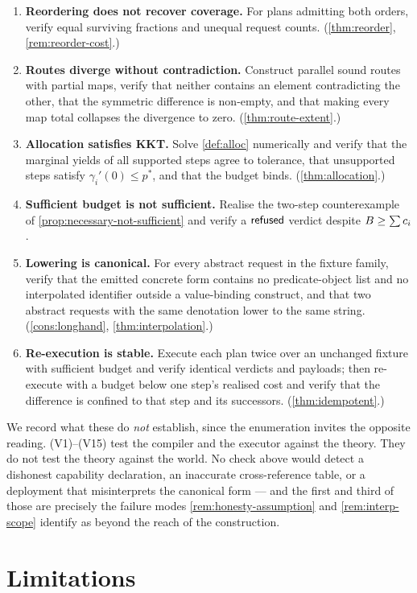 \begin{enumerate}[label=(V\arabic*),leftmargin=3em]
\item \textbf{Reordering does not recover coverage.} For plans admitting both
orders, verify equal surviving fractions and unequal request counts.
(\cref{thm:reorder}, \cref{rem:reorder-cost}.)
\item \textbf{Routes diverge without contradiction.} Construct parallel sound
routes with partial maps, verify that neither contains an element contradicting
the other, that the symmetric difference is non-empty, and that making every
map total collapses the divergence to zero.
(\cref{thm:route-extent}.)
\item \textbf{Allocation satisfies KKT.} Solve \cref{def:alloc} numerically and
verify that the marginal yields of all supported steps agree to tolerance, that
unsupported steps satisfy $\gamma_i'(0) \leq p^\ast$, and that the budget binds.
(\cref{thm:allocation}.)
\item \textbf{Sufficient budget is not sufficient.} Realise the two-step
counterexample of \cref{prop:necessary-not-sufficient} and verify a $\textsf{refused}$
verdict despite $B \geq \sum c_i$.
\item \textbf{Lowering is canonical.} For every abstract request in the fixture
family, verify that the emitted concrete form contains no predicate-object list
and no interpolated identifier outside a value-binding construct, and that two
abstract requests with the same denotation lower to the same string.
(\cref{cons:longhand}, \cref{thm:interpolation}.)
\item \textbf{Re-execution is stable.} Execute each plan twice over an unchanged
fixture with sufficient budget and verify identical verdicts and payloads; then
re-execute with a budget below one step's realised cost and verify that the
difference is confined to that step and its successors.
(\cref{thm:idempotent}.)
\end{enumerate}

We record what these do \emph{not} establish, since the enumeration invites the
opposite reading. (V1)--(V15) test the compiler and the executor against the
theory. They do not test the theory against the world. No check above would
detect a dishonest capability declaration, an inaccurate cross-reference table,
or a deployment that misinterprets the canonical form --- and the first and
third of those are precisely the failure modes \cref{rem:honesty-assumption}
and \cref{rem:interp-scope} identify as beyond the reach of the construction.

\section{Limitations}
\label{sec:limits}

